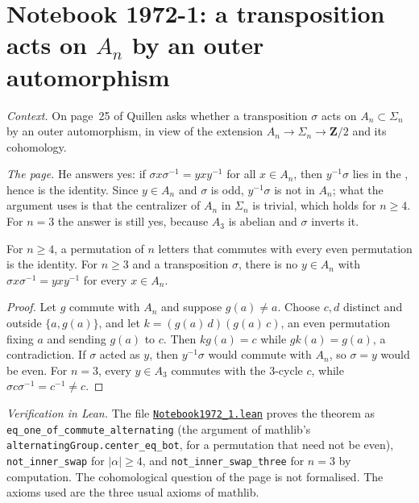 \section[Notebook 1972-1: a transposition acts on $A_n$ by an outer automorphism]{Notebook 1972-1: a transposition acts on $A_n$ by an outer automorphism\protect{}}\label{sec:quillen-1972-1}

\emph{Context.} On page~25 of  Quillen asks whether a transposition $\sigma$ acts on $A_n \subset \Sigma_n$ by an outer automorphism, in view of the extension $A_n \to \Sigma_n \to \mathbf Z/2$ and its cohomology.

\emph{The page.} He answers yes: if $\sigma x\sigma^{-1} = yxy^{-1}$ for all $x \in A_n$, then $y^{-1}\sigma$ lies in the , hence is the identity. Since $y \in A_n$ and $\sigma$ is odd, $y^{-1}\sigma$ is not in $A_n$; what the argument uses is that the centralizer of $A_n$ in $\Sigma_n$ is trivial, which holds for $n \ge 4$. For $n = 3$ the answer is still yes, because $A_3$ is abelian and $\sigma$ inverts it.

\begin{encadre}
\begin{theoreme}\label{thm:quillen-1972-1}
For $n \ge 4$, a permutation of $n$ letters that commutes with every even permutation is the identity. For $n \ge 3$ and a transposition $\sigma$, there is no $y \in A_n$ with $\sigma x \sigma^{-1} = yxy^{-1}$ for every $x \in A_n$.
\end{theoreme}
\end{encadre}

\begin{proof}
Let $g$ commute with $A_n$ and suppose $g(a) \ne a$. Choose $c, d$ distinct and outside $\{a, g(a)\}$, and let $k = (g(a)\,d)(g(a)\,c)$, an even permutation fixing $a$ and sending $g(a)$ to $c$. Then $kg(a) = c$ while $gk(a) = g(a)$, a contradiction. If $\sigma$ acted as $y$, then $y^{-1}\sigma$ would commute with $A_n$, so $\sigma = y$ would be even. For $n = 3$, every $y \in A_3$ commutes with the $3$-cycle $c$, while $\sigma c\sigma^{-1} = c^{-1} \ne c$.
\end{proof}

\emph{Verification in Lean.} The file \href{\leanblobmain/Notebook1972_1.lean}{\texttt{Notebook1972\_1.\allowbreak{}lean}} proves the theorem as \texttt{eq\_one\_of\_commute\_alternating} (the argument of mathlib's \texttt{alternatingGroup.center\_eq\_bot}, for a permutation that need not be even), \texttt{not\_inner\_swap} for $|\alpha| \ge 4$, and \texttt{not\_inner\_swap\_three} for $n = 3$ by computation. The cohomological question of the page is not formalised. The axioms used are the three usual axioms of mathlib.

